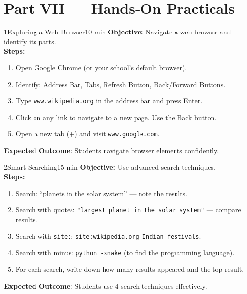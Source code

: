 \chapter{Part VII --- Hands-On Practicals}
\label{ch:lab7}


\begin{labactivity}{1}{Exploring a Web Browser}{10 min}
\textbf{Objective:} Navigate a web browser and identify its parts.\\[4pt]
\textbf{Steps:}
\begin{enumerate}[label=\protect\stepcircle{\arabic*}, leftmargin=2cm, itemsep=4pt]
  \item Open Google Chrome (or your school's default browser).
  \item Identify: Address Bar, Tabs, Refresh Button, Back/Forward Buttons.
  \item Type \texttt{www.wikipedia.org} in the address bar and press Enter.
  \item Click on any link to navigate to a new page. Use the Back button.
  \item Open a new tab (+) and visit \texttt{www.google.com}.
\end{enumerate}
\textbf{Expected Outcome:} Students navigate browser elements confidently.
\welldone
\end{labactivity}

\begin{labactivity}{2}{Smart Searching}{15 min}
\textbf{Objective:} Use advanced search techniques.\\[4pt]
\textbf{Steps:}
\begin{enumerate}[label=\protect\stepcircle{\arabic*}, leftmargin=2cm, itemsep=4pt]
  \item Search: ``planets in the solar system'' --- note the results.
  \item Search with quotes: \texttt{"largest planet in the solar system"} --- compare results.
  \item Search with \texttt{site:}: \texttt{site:wikipedia.org Indian festivals}.
  \item Search with minus: \texttt{python -snake} (to find the programming language).
  \item For each search, write down how many results appeared and the top result.
\end{enumerate}
\textbf{Expected Outcome:} Students use 4 search techniques effectively.
\welldone
\end{labactivity}

